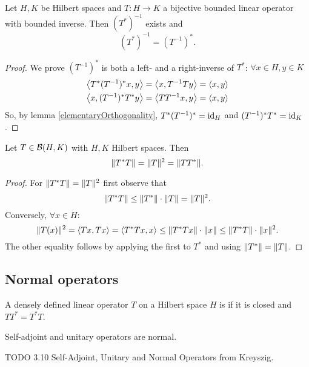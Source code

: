\begin{proposition}
Let $H,K$ be Hilbert spaces and $T:H\to K$ a bijective bounded linear operator with bounded inverse. Then $(T^*)^{-1}$ exists and
\[ (T^*)^{-1} = (T^{-1})^*. \]
\end{proposition}
\begin{proof}
We prove $(T^{-1})^*$ is both a left- and a right-inverse of $T^*$: $\forall x\in H, y\in K$
\begin{align*}
\left\langle T^*(T^{-1})^*x,y \right\rangle &= \left\langle x,T^{-1}Ty \right\rangle = \left\langle x,y \right\rangle \\
\left\langle x,(T^{-1})^*T^*y \right\rangle &= \left\langle TT^{-1}x,y \right\rangle = \left\langle x,y \right\rangle
\end{align*}
So, by lemma \ref{elementaryOrthogonality}, $T^*(T^{-1})^* = \operatorname{id}_H$ and $(T^{-1})^*T^* = \operatorname{id}_K$.
\end{proof}

\begin{proposition} \label{normOfSquare}
Let $T\in \operatorname{\mathcal{B}}(H,K)$ with $H,K$ Hilbert spaces. Then
\[ \lVert T^*T\rVert= \lVert T\rVert^2 = \lVert TT^*\rVert. \]
\end{proposition}
\begin{proof}
For $\lVert T^*T\rVert= \lVert T\rVert^2$ first observe that
\[ \lVert T^*T\rVert \leq \lVert T^*\rVert\cdot\lVert T\rVert = \lVert T\rVert^2. \]
Conversely, $\forall x\in H$:
\[ \lVert T(x)\rVert^2 = \left\langle Tx,Tx \right\rangle = \left\langle T^*Tx,x \right\rangle \leq \lVert T^*Tx\rVert\cdot \lVert x\rVert \leq \lVert T^*T\rVert\cdot\lVert x\rVert^2. \]
The other equality follows by applying the first to $T^*$ and using $\lVert T^*\rVert=\lVert T\rVert$.
\end{proof}

\subsection{Normal operators}
\begin{definition}
A densely defined linear operator $T$ on a Hilbert space $H$ is  if it is closed and $TT^* = T^*T$.
\end{definition}
Self-adjoint and unitary operators are normal.

TODO 3.10 Self-Adjoint, Unitary and Normal Operators from Kreyszig.


